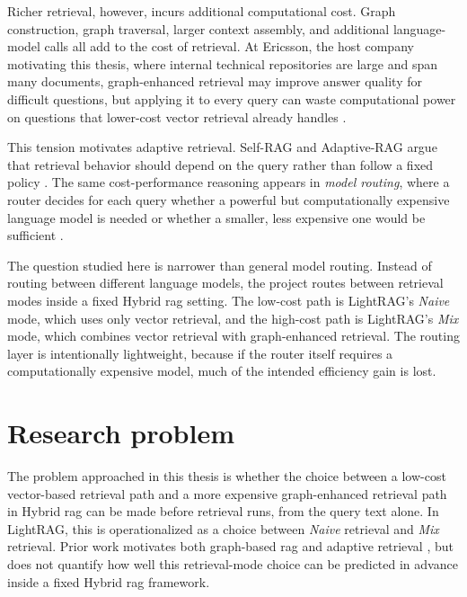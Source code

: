 \documentclass[english, bibtex]{kththesis}               %
\numberwithin{listing}{chapter}
\begin{document}
Richer retrieval, however, incurs additional computational cost. Graph construction, graph traversal, larger context assembly, and additional language-model calls all add to the cost of retrieval. At Ericsson, the host company motivating this thesis, where internal technical repositories are large and span many documents, graph-enhanced retrieval may improve answer quality for difficult questions, but applying it to every query can waste computational power on questions that lower-cost vector retrieval already handles \cite{jeong2024adaptiverag,hu2024routerbench}.

This tension motivates adaptive retrieval. Self-RAG and Adaptive-RAG argue that retrieval behavior should depend on the query rather than follow a fixed policy \cite{jeong2024adaptiverag,asai2023selfrag}. The same cost-performance reasoning appears in \emph{model routing}, where a router decides for each query whether a powerful but computationally expensive language model is needed or whether a smaller, less expensive one would be sufficient \cite{hu2024routerbench}.

The question studied here is narrower than general model routing. Instead of routing between different language models, the project routes between retrieval modes inside a fixed Hybrid \gls{rag} setting. The low-cost path is LightRAG's \emph{Naive} mode, which uses only vector retrieval, and the high-cost path is LightRAG's \emph{Mix} mode, which combines vector retrieval with graph-enhanced retrieval. The routing layer is intentionally lightweight, because if the router itself requires a computationally expensive model, much of the intended efficiency gain is lost.

\section{Research problem}
\label{sec:problem}

The problem approached in this thesis is whether the choice between a low-cost vector-based retrieval path and a more expensive graph-enhanced retrieval path in Hybrid \gls{rag} can be made before retrieval runs, from the query text alone. In LightRAG, this is operationalized as a choice between \emph{Naive} retrieval and \emph{Mix} retrieval. Prior work motivates both graph-based \gls{rag} and adaptive retrieval \cite{edge2024graphrag,lightrag2024,asai2023selfrag,jeong2024adaptiverag}, but does not quantify how well this retrieval-mode choice can be predicted in advance inside a fixed Hybrid \gls{rag} framework.
\end{document}
